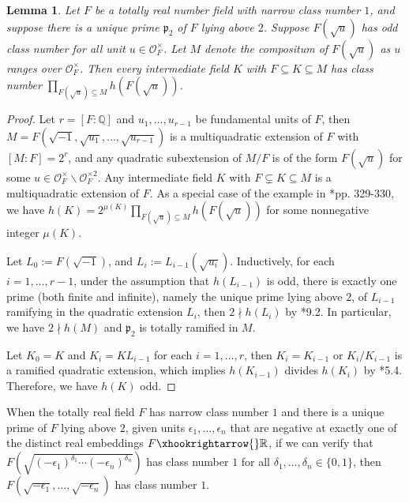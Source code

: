 \documentclass{amsart}
\numberwithin{equation}{subsection}
\numberwithin{theorem}{section}
\newtheorem{lemma}[theorem]{Lemma}
\theoremstyle{definition}
\theoremstyle{remark}
\newcommand{\bQ}{\mathbb{Q}}
\newcommand{\bR}{\mathbb{R}}
\newcommand{\cO}{\mathcal{O}}
\newcommand{\fp}{\mathfrak{p}}
\begin{document}
\begin{lemma}
    Let $F$ be a totally real number field with narrow class number $1$, and suppose there is a unique prime $\fp_2$ of $F$ lying above $2$. Suppose $F(\sqrt{u})$ has odd class number for all unit $u\in \cO_F^\times$. Let $M$ denote the compositum of $F(\sqrt{u})$ as  $u$ ranges over $\cO_F^\times $. Then every intermediate field $K$ with $F \subseteq K \subseteq M$ has class number $\prod_{F(\sqrt{u}) \subseteq M} h(F(\sqrt{u}))$. 
\end{lemma}
\begin{proof}
    Let $r = [F:\bQ]$ and $u_1, \dotsc, u_{r-1}$ be fundamental units of $F$, then $M = F(\sqrt{-1}, \sqrt{u_1}, \dotsc, \sqrt{u_{r-1}})$ is a multiquadratic extension of $F$ with $[M:F] = 2^r$, and any quadratic subextension of $M/F$ is of the form $F(\sqrt{u})$ for some $u\in \cO_F^\times \backslash \cO_F^{\times 2}$. 
    Any intermediate field $K$ with $F\subsetneq K \subseteq M$ is a multiquadratic extension of $F$.
    As a special case of the example in \cite{MR3069610}*{pp. 329-330}, we have $h(K) = 2^{\mu(K)}\prod_{F(\sqrt{u}) \subseteq M} h(F(\sqrt{u}))$ for some nonnegative integer $\mu(K)$. 
    
    Let $L_0 := F(\sqrt{-1})$, and $L_i:= L_{i-1}(\sqrt{u_i})$.
    Inductively, for each $i=1, \dotsc, r-1$, under the assumption that $h(L_{i-1})$ is odd, there is exactly one prime (both finite and infinite), namely the unique prime lying above $2$, of $L_{i-1}$ ramifying in the quadratic extension $L_i$, then $2\nmid h(L_{i})$ by \cite{MR963648}*{9.2}. In particular, we have $2\nmid h(M)$ and $\fp_2$ is totally ramified in $M$. 

    Let $K_0 = K$ and $K_i = KL_{i-1}$ for each $i = 1, \dotsc, r$, then $K_i = K_{i-1}$ or $K_{i}/K_{i-1}$ is a ramified quadratic extension, which implies $h(K_{i-1})$ divides $h(K_i)$ by \cite{MR963648}*{5.4}. Therefore, we have $h(K)$ odd. 
\end{proof}

When the totally real field $F$ has narrow class number $1$ and there is a unique prime of $F$ lying above $2$, given units $\epsilon_1, \dotsc, \epsilon_n$ that are negative at exactly one of the distinct real embeddings $F\xhookrightarrow{} \bR$, if we can verify that $F\left(\sqrt{(-\epsilon_1)^{\delta_1} \cdots (-\epsilon_n)^{\delta_n}}\right)$ has class number $1$ for all $\delta_1, \dotsc, \delta_n \in \{0,1\}$, then $F(\sqrt{-\epsilon_1}, \dotsc, \sqrt{-\epsilon_n})$ has class number $1$. 
 
\end{document}
